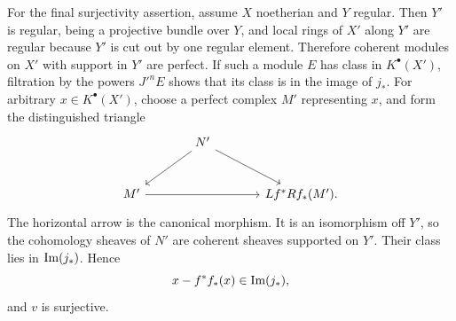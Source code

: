 \documentclass[11pt]{article}
\begin{document}
For the final surjectivity assertion, assume \(X\) noetherian and \(Y\) regular. Then \(Y'\) is regular, being a projective bundle over \(Y\), and local rings of \(X'\) along \(Y'\) are regular because \(Y'\) is cut out by one regular element. Therefore coherent modules on \(X'\) with support in \(Y'\) are perfect. If such a module \(E\) has class in \(K^\bullet(X')\), filtration by the powers \(J'^nE\) shows that its class is in the image of \(j_*\). For arbitrary \(x\in K^\bullet(X')\), choose a perfect complex \(M'\) representing \(x\), and form the distinguished triangle
\[
\begin{tikzcd}[column sep=large,row sep=large]
& N' \arrow[dl] \arrow[dr] &\\
M' \arrow[rr] && Lf^*Rf_*(M').
\end{tikzcd}
\]
The horizontal arrow is the canonical morphism. It is an isomorphism off \(Y'\), so the cohomology sheaves of \(N'\) are coherent sheaves supported on \(Y'\). Their class lies in \(\operatorname{Im}(j_*)\). Hence
\[
x-f^*f_*(x)\in\operatorname{Im}(j_*),
\]
and \(v\) is surjective.
\end{document}

